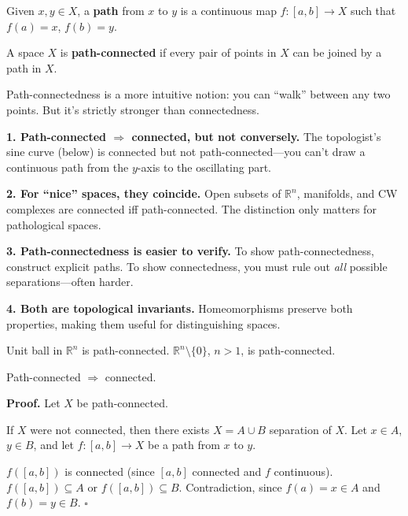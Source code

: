 \documentclass[11pt]{report}
\renewenvironment{proof}[1][Proof]{\noindent\textbf{#1.} }{\hfill$\square$\par\vspace{5pt}}
\begin{document}
\begin{defbox}
Given $x, y \in X$, a \textbf{path} from $x$ to $y$ is a continuous map $f: [a, b] \to X$ such that $f(a) = x$, $f(b) = y$.

A space $X$ is \textbf{path-connected} if every pair of points in $X$ can be joined by a path in $X$.
\end{defbox}

\begin{rembox}
Path-connectedness is a more intuitive notion: you can ``walk'' between any two points. But it's strictly stronger than connectedness.

\textbf{1. Path-connected $\Rightarrow$ connected, but not conversely.}
The topologist's sine curve (below) is connected but not path-connected---you can't draw a continuous path from the $y$-axis to the oscillating part.

\textbf{2. For ``nice'' spaces, they coincide.} Open subsets of $\mathbb{R}^n$, manifolds, and CW complexes are connected iff path-connected. The distinction only matters for pathological spaces.

\textbf{3. Path-connectedness is easier to verify.} To show path-connectedness, construct explicit paths. To show connectedness, you must rule out \emph{all} possible separations---often harder.

\textbf{4. Both are topological invariants.} Homeomorphisms preserve both properties, making them useful for distinguishing spaces.
\end{rembox}

\begin{exbox}
Unit ball in $\mathbb{R}^n$ is path-connected. $\mathbb{R}^n \setminus \{0\}$, $n > 1$, is path-connected.
\end{exbox}

\begin{thmbox}
Path-connected $\Rightarrow$ connected.
\end{thmbox}

\begin{proof}
Let $X$ be path-connected.

If $X$ were not connected, then there exists $X = A \cup B$ separation of $X$. Let $x \in A$, $y \in B$, and let $f: [a, b] \to X$ be a path from $x$ to $y$.

$f([a, b])$ is connected (since $[a, b]$ connected and $f$ continuous). $f([a, b]) \subseteq A$ or $f([a, b]) \subseteq B$. Contradiction, since $f(a) = x \in A$ and $f(b) = y \in B$.
\end{proof}
\end{document}
